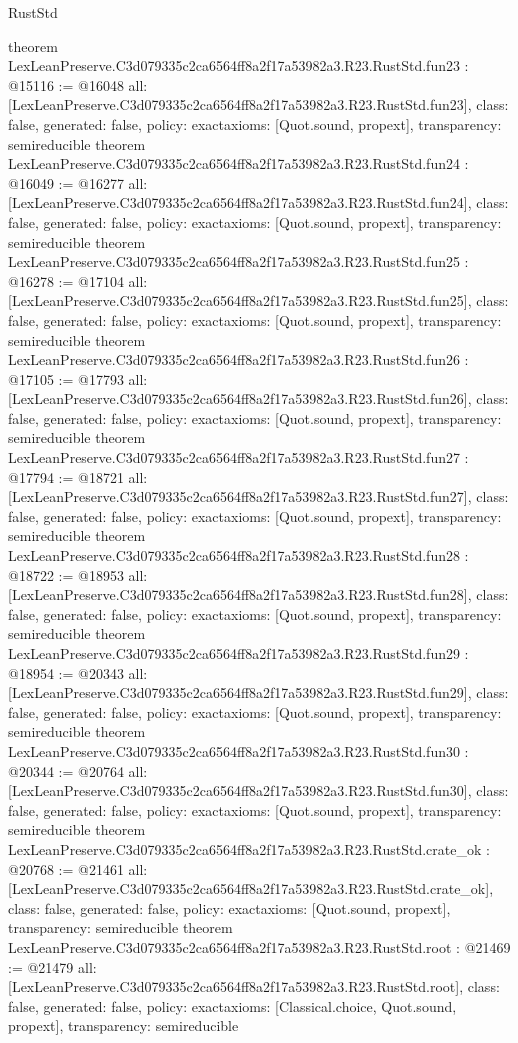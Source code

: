 \begin{lexlean}{RustStd}
\begin{coremodule}
{}
theorem LexLeanPreserve.C3d079335c2ca6564ff8a2f17a53982a3.R23.RustStd.fun23 : @15116 := @16048 {
  all: [LexLeanPreserve.C3d079335c2ca6564ff8a2f17a53982a3.R23.RustStd.fun23],
  class: false,
  generated: false,
  policy: exact{axioms: [Quot.sound, propext]},
  transparency: semireducible
}
theorem LexLeanPreserve.C3d079335c2ca6564ff8a2f17a53982a3.R23.RustStd.fun24 : @16049 := @16277 {
  all: [LexLeanPreserve.C3d079335c2ca6564ff8a2f17a53982a3.R23.RustStd.fun24],
  class: false,
  generated: false,
  policy: exact{axioms: [Quot.sound, propext]},
  transparency: semireducible
}
theorem LexLeanPreserve.C3d079335c2ca6564ff8a2f17a53982a3.R23.RustStd.fun25 : @16278 := @17104 {
  all: [LexLeanPreserve.C3d079335c2ca6564ff8a2f17a53982a3.R23.RustStd.fun25],
  class: false,
  generated: false,
  policy: exact{axioms: [Quot.sound, propext]},
  transparency: semireducible
}
theorem LexLeanPreserve.C3d079335c2ca6564ff8a2f17a53982a3.R23.RustStd.fun26 : @17105 := @17793 {
  all: [LexLeanPreserve.C3d079335c2ca6564ff8a2f17a53982a3.R23.RustStd.fun26],
  class: false,
  generated: false,
  policy: exact{axioms: [Quot.sound, propext]},
  transparency: semireducible
}
theorem LexLeanPreserve.C3d079335c2ca6564ff8a2f17a53982a3.R23.RustStd.fun27 : @17794 := @18721 {
  all: [LexLeanPreserve.C3d079335c2ca6564ff8a2f17a53982a3.R23.RustStd.fun27],
  class: false,
  generated: false,
  policy: exact{axioms: [Quot.sound, propext]},
  transparency: semireducible
}
theorem LexLeanPreserve.C3d079335c2ca6564ff8a2f17a53982a3.R23.RustStd.fun28 : @18722 := @18953 {
  all: [LexLeanPreserve.C3d079335c2ca6564ff8a2f17a53982a3.R23.RustStd.fun28],
  class: false,
  generated: false,
  policy: exact{axioms: [Quot.sound, propext]},
  transparency: semireducible
}
theorem LexLeanPreserve.C3d079335c2ca6564ff8a2f17a53982a3.R23.RustStd.fun29 : @18954 := @20343 {
  all: [LexLeanPreserve.C3d079335c2ca6564ff8a2f17a53982a3.R23.RustStd.fun29],
  class: false,
  generated: false,
  policy: exact{axioms: [Quot.sound, propext]},
  transparency: semireducible
}
theorem LexLeanPreserve.C3d079335c2ca6564ff8a2f17a53982a3.R23.RustStd.fun30 : @20344 := @20764 {
  all: [LexLeanPreserve.C3d079335c2ca6564ff8a2f17a53982a3.R23.RustStd.fun30],
  class: false,
  generated: false,
  policy: exact{axioms: [Quot.sound, propext]},
  transparency: semireducible
}
theorem LexLeanPreserve.C3d079335c2ca6564ff8a2f17a53982a3.R23.RustStd.crate_ok : @20768 := @21461 {
  all: [LexLeanPreserve.C3d079335c2ca6564ff8a2f17a53982a3.R23.RustStd.crate_ok],
  class: false,
  generated: false,
  policy: exact{axioms: [Quot.sound, propext]},
  transparency: semireducible
}
theorem LexLeanPreserve.C3d079335c2ca6564ff8a2f17a53982a3.R23.RustStd.root : @21469 := @21479 {
  all: [LexLeanPreserve.C3d079335c2ca6564ff8a2f17a53982a3.R23.RustStd.root],
  class: false,
  generated: false,
  policy: exact{axioms: [Classical.choice, Quot.sound, propext]},
  transparency: semireducible
}


\end{coremodule}
\end{lexlean}
